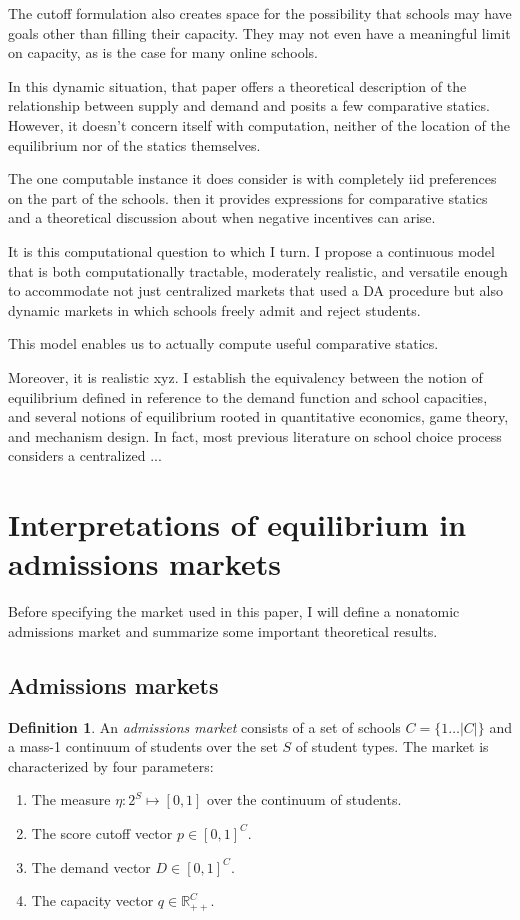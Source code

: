 \documentclass[12pt]{article}
\theoremstyle{definition}
\newtheorem{definition}{Definition}
\begin{document}
The cutoff formulation also creates space for the possibility that schools may have goals other than filling their capacity. They may not even have a meaningful limit on capacity, as is the case for many online schools.

In this dynamic situation, that paper offers a theoretical description of the relationship between supply and demand and posits a few comparative statics. However, it doesn't concern itself with computation, neither of the location of the equilibrium nor of the statics themselves. 

The one computable instance it does consider is with completely iid preferences on the part of the schools. then it provides expressions for comparative statics and a theoretical discussion about when negative incentives can arise.

It is this computational question to which I turn. I propose a continuous model that is both computationally tractable, moderately realistic, and versatile enough to accommodate not just centralized markets that used a DA procedure but also dynamic markets in which schools freely admit and reject students.

This model enables us to actually compute useful comparative statics. 

Moreover, it is realistic xyz.
I establish the equivalency between the notion of equilibrium defined in reference to the demand function and school capacities, and several notions of equilibrium rooted in quantitative economics, game theory, and mechanism design. In fact, most previous literature on school choice process considers a centralized ...

\section{Interpretations of equilibrium in admissions markets}
Before specifying the market used in this paper, I will define a nonatomic admissions market and summarize some important theoretical results.

\subsection{Admissions markets}
\begin{definition} An \emph{admissions market} consists of a set of schools $C = \{ 1\dots |C| \}$ and a mass-1 continuum of students over the set $S$ of student types. The market is characterized by four parameters:
\begin{enumerate}
\item The measure $\eta: 2^S \mapsto [0, 1]$ over the continuum of students.
\item The score cutoff vector $p \in [0, 1]^C$. 
\item The demand vector $D \in [0, 1]^C$.
\item The capacity vector $q \in \mathbb{R}_{++}^C$.
\end{enumerate}
\end{definition}
\end{document}
